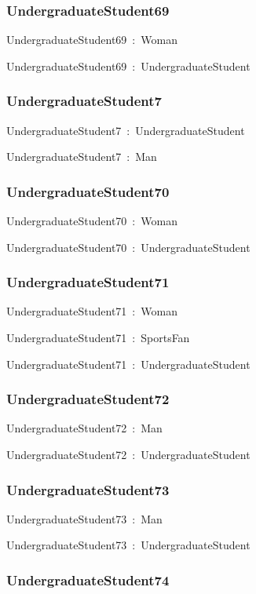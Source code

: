 \documentclass{article}
\begin{document}
\subsubsection*{UndergraduateStudent69}

UndergraduateStudent69~:~Woman

UndergraduateStudent69~:~UndergraduateStudent

\subsubsection*{UndergraduateStudent7}

UndergraduateStudent7~:~UndergraduateStudent

UndergraduateStudent7~:~Man

\subsubsection*{UndergraduateStudent70}

UndergraduateStudent70~:~Woman

UndergraduateStudent70~:~UndergraduateStudent

\subsubsection*{UndergraduateStudent71}

UndergraduateStudent71~:~Woman

UndergraduateStudent71~:~SportsFan

UndergraduateStudent71~:~UndergraduateStudent

\subsubsection*{UndergraduateStudent72}

UndergraduateStudent72~:~Man

UndergraduateStudent72~:~UndergraduateStudent

\subsubsection*{UndergraduateStudent73}

UndergraduateStudent73~:~Man

UndergraduateStudent73~:~UndergraduateStudent

\subsubsection*{UndergraduateStudent74}
\end{document}
